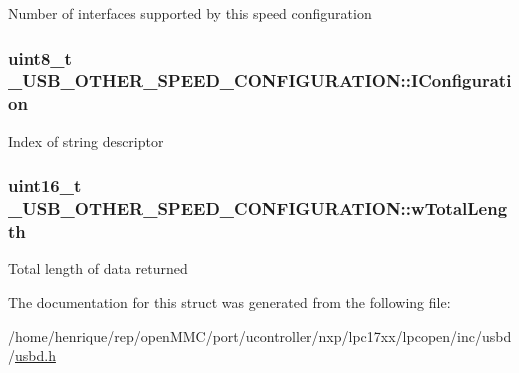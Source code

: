 Number of interfaces supported by this speed configuration \hypertarget{struct__USB__OTHER__SPEED__CONFIGURATION_a69e71d4b33b56469a4388c07e811e390}{
\subsubsection[{I\-Configuration}]{\setlength{\rightskip}{0pt plus 5cm}uint8\-\_\-t \-\_\-\-U\-S\-B\-\_\-\-O\-T\-H\-E\-R\-\_\-\-S\-P\-E\-E\-D\-\_\-\-C\-O\-N\-F\-I\-G\-U\-R\-A\-T\-I\-O\-N\-::\-I\-Configuration}}\label{struct__USB__OTHER__SPEED__CONFIGURATION_a69e71d4b33b56469a4388c07e811e390}
Index of string descriptor \hypertarget{struct__USB__OTHER__SPEED__CONFIGURATION_af624dbc10570cb8fbca7323c6bffcb70}{
\subsubsection[{w\-Total\-Length}]{\setlength{\rightskip}{0pt plus 5cm}uint16\-\_\-t \-\_\-\-U\-S\-B\-\_\-\-O\-T\-H\-E\-R\-\_\-\-S\-P\-E\-E\-D\-\_\-\-C\-O\-N\-F\-I\-G\-U\-R\-A\-T\-I\-O\-N\-::w\-Total\-Length}}\label{struct__USB__OTHER__SPEED__CONFIGURATION_af624dbc10570cb8fbca7323c6bffcb70}
Total length of data returned 

The documentation for this struct was generated from the following file\-:\begin{DoxyCompactItemize}
\item 
/home/henrique/rep/open\-M\-M\-C/port/ucontroller/nxp/lpc17xx/lpcopen/inc/usbd/\hyperlink{usbd_8h}{usbd.\-h}\end{DoxyCompactItemize}
